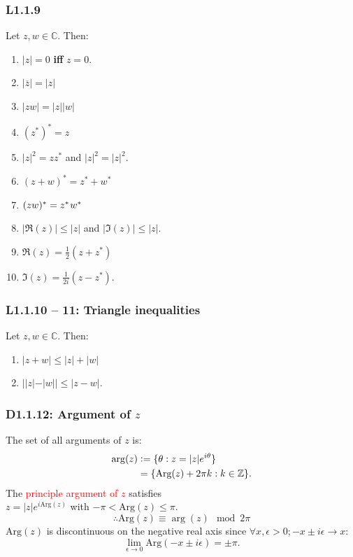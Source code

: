 \documentclass{article}
\newcommand{\deq}{\vcentcolon=}
\begin{document}
\begin{multicols*}{3}
\newcolumn

\subsubsection*{L1.1.9}
Let $z,w\in\mathbb{C}$. Then:
\begin{enumerate}
    \item $|z|=0$ \textbf{if{}f} $z=0$.
    
    \item $|\overline{z}|=|z|$
    
    \item $|zw|=|z||w|$
    
    \item $(z^*)^*=z$
    
    \item $|z|^2=zz^*$ and $|z|^2=|z|^2$.
    
    \item $(z+w)^*=z^*+w^*$
    
    \item $(zw)^*=z^*\hspace{0.01in}w^*$
    
    \item $|\Re(z)|\leq|z|$ and $|\Im(z)|\leq|z|$.
    
    \item $\Re(z)=\frac{1}{2}(z+z^*)$
    
    \item $\Im(z)=\frac{1}{2i}(z-z^*)$.
\end{enumerate}

\subsubsection*{L1.1.10 -- 11: Triangle inequalities}
Let $z,w\in\mathbb{C}$. Then:
\begin{enumerate}
    \item $|z+w|\leq|z|+|w|$
    
    \item $||z|-|w||\leq|z-w|$.
\end{enumerate}

\subsubsection*{D1.1.12: Argument of $z$}
The set of all arguments of $z$ is:
\begin{align*}
    \arg(z)
    &\deq\{\theta:z=|z|e^{i\theta}\} \\
    &=\{\text{Arg}(z)+2\pi k:k\in\mathbb{Z}\}.
\end{align*}
The \textcolor{red}
{principle argument of $z$} satisfies \\
$z=|z|e^{i\text{Arg}(z)}$ with
$-\pi<\text{Arg}(z)\leq\pi$.
$$\therefore\text{Arg}(z)\equiv\arg(z)\mod 2\pi$$
$\text{Arg}(z)$ is discontinuous on the negative real axis
since $\forall x,\epsilon>0;-x\pm i\epsilon\rightarrow x$:
$$\lim_{\epsilon\rightarrow0}\text{Arg}(-x\pm i\epsilon)=\pm\pi.$$


\end{multicols*}
\end{document}
